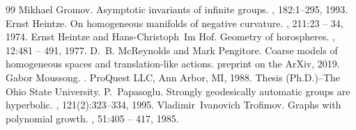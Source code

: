 \documentclass[10pt,a4paper]{amsart}
\theoremstyle{definition}
\theoremstyle{remark}
\begin{document}
\begin{thebibliography}{99}
 Mikhael Gromov. \newblock Asymptotic invariants of infinite groups. , 182:1--295, 1993.
 Ernst Heintze. \newblock On homogeneous manifolds of negative curvature. , 211:23 -- 34, 1974.
 Ernst Heintze and Hans-Christoph~Im Hof. \newblock Geometry of horospheres. , 12:481 -- 491, 1977.
 D.~B. McReynolds and Mark Pengitore. \newblock Coarse models of homogeneous spaces and translation-like actions. \newblock preprint on the ArXiv, 2019.
 Gabor Moussong. . \newblock ProQuest LLC, Ann Arbor, MI, 1988. \newblock Thesis (Ph.D.)--The Ohio State University.
 P.~Papasoglu. \newblock Strongly geodesically automatic groups are hyperbolic. , 121(2):323--334, 1995.
 Vladimir~Ivanovich Trofimov. \newblock Graphs with polynomial growth. , 51:405 -- 417, 1985.
\end{thebibliography}
\end{document}
